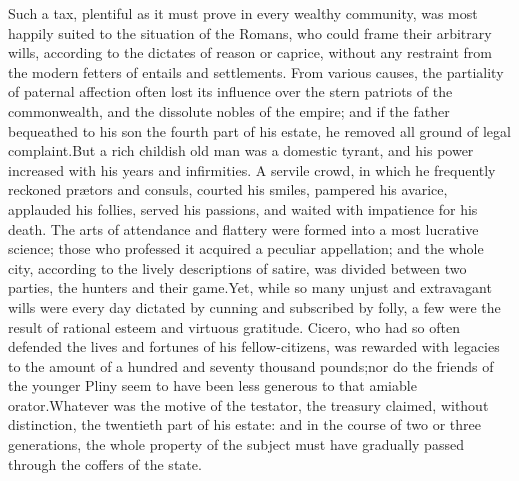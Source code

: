 



Such a tax, plentiful as it must prove in every wealthy
community, was most happily suited to the situation of the
Romans, who could frame their arbitrary wills, according to the
dictates of reason or caprice, without any restraint from the
modern fetters of entails and settlements. From various causes,
the partiality of paternal affection often lost its influence
over the stern patriots of the commonwealth, and the dissolute
nobles of the empire; and if the father bequeathed to his son the
fourth part of his estate, he removed all ground of legal
complaint.\footnotemark[106] But a rich childish old man was a domestic tyrant,
and his power increased with his years and infirmities. A servile
crowd, in which he frequently reckoned prætors and consuls,
courted his smiles, pampered his avarice, applauded his follies,
served his passions, and waited with impatience for his death.
The arts of attendance and flattery were formed into a most
lucrative science; those who professed it acquired a peculiar
appellation; and the whole city, according to the lively
descriptions of satire, was divided between two parties, the
hunters and their game.\footnotemark[107] Yet, while so many unjust and
extravagant wills were every day dictated by cunning and
subscribed by folly, a few were the result of rational esteem and
virtuous gratitude. Cicero, who had so often defended the lives
and fortunes of his fellow-citizens, was rewarded with legacies
to the amount of a hundred and seventy thousand pounds;\footnotemark[108] nor
do the friends of the younger Pliny seem to have been less
generous to that amiable orator.\footnotemark[109] Whatever was the motive of
the testator, the treasury claimed, without distinction, the
twentieth part of his estate: and in the course of two or three
generations, the whole property of the subject must have
gradually passed through the coffers of the state.

